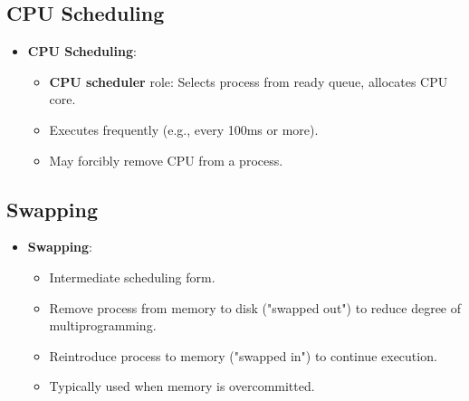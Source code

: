 \subsection{CPU Scheduling}
\begin{itemize}
    \item \textbf{CPU Scheduling}:
        \begin{itemize}
            \item \textbf{CPU scheduler} role: Selects process from ready queue, allocates CPU core.
            \item Executes frequently (e.g., every 100ms or more).
            \item May forcibly remove CPU from a process.
        \end{itemize}
\end{itemize}

\subsection{Swapping}
\begin{itemize}
    \item \textbf{Swapping}:
        \begin{itemize}
            \item Intermediate scheduling form.
            \item Remove process from memory to disk ("swapped out") to reduce degree of multiprogramming.
            \item Reintroduce process to memory ("swapped in") to continue execution.
            \item Typically used when memory is overcommitted.
        \end{itemize}
\end{itemize}

